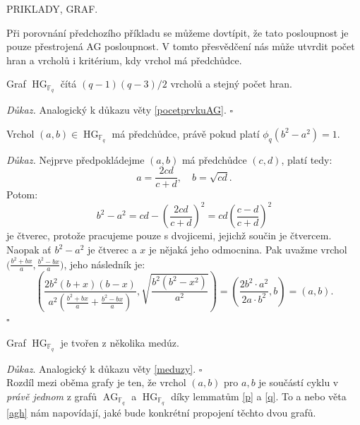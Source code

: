 \documentclass[12pt]{report}
\DeclareMathOperator{\AG}{AG}
\DeclareMathOperator{\HG}{HG}
\begin{document}
PRIKLADY, GRAF.


Při porovnání předchozího příkladu se můžeme dovtípit, že tato posloupnost je pouze přestrojená AG posloupnost. V tomto přesvědčení nás může utvrdit počet hran a vrcholů i kritérium, kdy vrchol má předchůdce.

\begin{veta}
Graf $\HG_{\mathbb{F}_q}$ čítá $(q-1)(q-3)/2$ vrcholů a stejný počet hran.
\end{veta}
\textit{Důkaz.} Analogický k důkazu věty \ref{pocetprvkuAG}. \hfill $\square$


\begin{lemma}\label{q}
Vrchol $(a,b) \in \HG_{\mathbb{F}_q}$ má předchůdce, právě pokud platí $\phi_q(b^2-a^2)=1$.
\end{lemma}

\noindent \textit{Důkaz.} Nejprve předpokládejme $(a,b)$ má předchůdce $(c,d)$, platí tedy:
\begin{equation*}
a = \frac{2cd}{c+d}, \quad b = \sqrt{cd}.
\end{equation*}
Potom:
\begin{equation*}
b^2-a^2 = cd- \left(\frac{2 cd}{c+d} \right)^2 = cd \left( \frac{c-d}{c+d} \right)^2
\end{equation*}
je čtverec, protože pracujeme pouze s dvojicemi, jejichž součin je čtvercem. Naopak ať $b^2-a^2$ je čtverec a $x$ je nějaká jeho odmocnina. Pak uvažme vrchol $\Big(\frac{b^2+b  x}{a},\frac{b^2-bx}{a} \Big)$, jeho následník je: $$\left(\frac{2 b^2 (b+x)(b-x)}{a^2 \left(\frac{b^2+bx}{a} + \frac{b^2-bx}{a} \right)}, \sqrt{\frac{b^2(b^2-x^2)}{a^2}} \right)= \left(\frac{2 b^2 \cdot a^2}{2 a \cdot b^2 }, b \right) = \left(a, b \right).$$
 \hfill $\square$


\begin{dusledek}
Graf $\HG_{\mathbb{F}_q}$ je tvořen z několika medúz.
\end{dusledek}
\noindent \textit{Důkaz}. Analogický k důkazu věty \ref{meduzy}. \hfill $\square$\\

Rozdíl mezi oběma grafy je ten, že vrchol $(a,b)$ pro $a,b$ je součástí cyklu v \textit{právě jednom} z grafů $\AG_{\mathbb{F}_q}$ a $\HG_{\mathbb{F}_q}$ díky lemmatům \ref{p} a \ref{q}. To a nebo věta \ref{agh} nám napovídají, jaké bude konkrétní propojení těchto dvou grafů.
\end{document}
